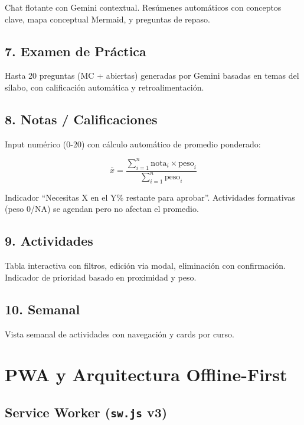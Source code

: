 \documentclass[
  spanish,
  11pt,
  a4paper,
]{article}
\begin{document}
Chat flotante con Gemini contextual. Resúmenes automáticos con conceptos
clave, mapa conceptual Mermaid, y preguntas de repaso.

\subsection{7. Examen de Práctica}\label{examen-de-pruxe1ctica}

Hasta 20 preguntas (MC + abiertas) generadas por Gemini basadas en temas
del sílabo, con calificación automática y retroalimentación.

\subsection{8. Notas / Calificaciones}\label{notas-calificaciones}

Input numérico (0-20) con cálculo automático de promedio ponderado:

\[\bar{x} = \frac{\sum_{i=1}^{n} \text{nota}_i \times \text{peso}_i}{\sum_{i=1}^{n} \text{peso}_i}\]

Indicador ``Necesitas X en el Y\% restante para aprobar''. Actividades
formativas (peso 0/NA) se agendan pero no afectan el promedio.

\subsection{9. Actividades}\label{actividades}

Tabla interactiva con filtros, edición via modal, eliminación con
confirmación. Indicador de prioridad basado en proximidad y peso.

\subsection{10. Semanal}\label{semanal}

Vista semanal de actividades con navegación y cards por curso.

\section{PWA y Arquitectura
Offline-First}\label{pwa-y-arquitectura-offline-first}

\subsection{\texorpdfstring{Service Worker (\texttt{sw.js}
v3)}{Service Worker (sw.js v3)}}\label{service-worker-sw.js-v3}
\end{document}

